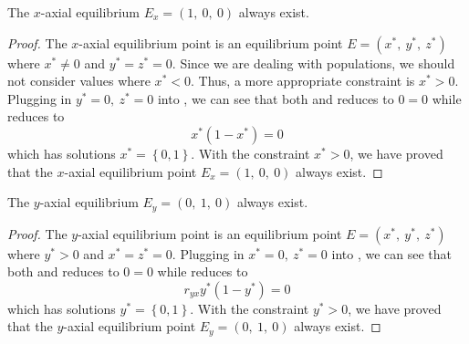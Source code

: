 \begin{theorem}\label{thm:axial-x-exist}
    The $x$-axial equilibrium $E_x=\left(1,\ 0,\ 0\right)$ always exist.
\end{theorem}
\begin{proof}
    The $x$-axial equilibrium point is an equilibrium point $E=\left(x^*,\ y^*,\ z^*\right)$ where $x^*\neq0$ and $y^*=z^*=0$. Since we are dealing with populations, we should not consider values where $x^*<0$. Thus, a more appropriate constraint is $x^*>0$. Plugging in $y^*=0,\ z^*=0$ into , we can see that both  and  reduces to $0=0$ while  reduces to
    \begin{equation*}
        x^*\left(1-x^*\right)=0
    \end{equation*}
    which has solutions $x^*=\left\{0,1\right\}$. With the constraint $x^*>0$, we have proved that the $x$-axial equilibrium point $E_x=\left(1,\ 0,\ 0\right)$ always exist.
\end{proof}

\begin{theorem}\label{thm:axial-y-exist}
    The $y$-axial equilibrium $E_y=\left(0,\ 1,\ 0\right)$ always exist.
\end{theorem}
\begin{proof}
    The $y$-axial equilibrium point is an equilibrium point $E=\left(x^*,\ y^*,\ z^*\right)$ where $y^*>0$ and $x^*=z^*=0$. Plugging in $x^*=0,\ z^*=0$ into , we can see that both  and  reduces to $0=0$ while  reduces to
    \begin{equation*}
        r_{yx}y^*\left(1-y^*\right)=0
    \end{equation*}
    which has solutions $y^*=\left\{0,1\right\}$. With the constraint $y^*>0$, we have proved that the $y$-axial equilibrium point $E_y=\left(0,\ 1,\ 0\right)$ always exist.
\end{proof}

